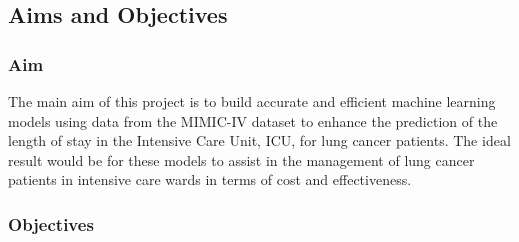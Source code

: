 \documentclass[11pt]{article}
\begin{document}

\subsection{Aims and Objectives}

\subsubsection{Aim}

The main aim of this project is to build accurate and efficient machine learning models using data from the MIMIC-IV dataset to enhance the prediction of the length of stay in the Intensive Care Unit, ICU, for lung cancer patients. The ideal result would be for these models to assist in the management of lung cancer patients in intensive care wards in terms of cost and effectiveness.

\subsubsection{Objectives}
\end{document}
